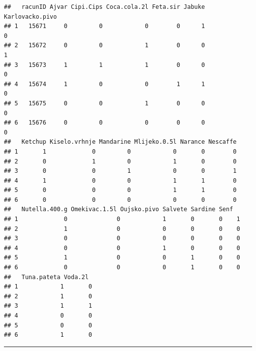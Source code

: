 \documentclass[]{book}
\newenvironment{Shaded}{\begin{snugshade}}{\end{snugshade}}
\newcommand{\KeywordTok}[1]{\textcolor[rgb]{0.13,0.29,0.53}{\textbf{#1}}}
\newcommand{\DataTypeTok}[1]{\textcolor[rgb]{0.13,0.29,0.53}{#1}}
\newcommand{\DecValTok}[1]{\textcolor[rgb]{0.00,0.00,0.81}{#1}}
\newcommand{\StringTok}[1]{\textcolor[rgb]{0.31,0.60,0.02}{#1}}
\newcommand{\OperatorTok}[1]{\textcolor[rgb]{0.81,0.36,0.00}{\textbf{#1}}}
\newcommand{\NormalTok}[1]{#1}
\theoremstyle{definition}
\theoremstyle{definition}
\theoremstyle{definition}
\theoremstyle{remark}
\begin{document}
\begin{Shaded}
\end{Shaded}

\begin{verbatim}
##   racunID Ajvar Cipi.Cips Coca.cola.2l Feta.sir Jabuke Karlovacko.pivo
## 1   15671     0         0            0        0      1               0
## 2   15672     0         0            1        0      0               1
## 3   15673     1         1            1        0      0               0
## 4   15674     1         0            0        1      1               0
## 5   15675     0         0            1        0      0               0
## 6   15676     0         0            0        0      0               0
##   Ketchup Kiselo.vrhnje Mandarine Mlijeko.0.5l Narance Nescaffe
## 1       1             0         0            0       0        0
## 2       0             1         0            1       0        0
## 3       0             0         1            0       0        1
## 4       1             0         0            1       1        0
## 5       0             0         0            1       1        0
## 6       0             0         0            0       0        0
##   Nutella.400.g Omekivac.1.5l Oujsko.pivo Salvete Sardine Senf
## 1             0              0            1       0       0    1
## 2             1              0            0       0       0    0
## 3             0              0            0       0       0    0
## 4             0              0            1       0       0    0
## 5             1              0            0       1       0    0
## 6             0              0            0       1       0    0
##   Tuna.pateta Voda.2l
## 1            1       0
## 2            1       0
## 3            1       1
## 4            0       0
## 5            0       0
## 6            1       0
\end{verbatim}

\begin{center}\rule{0.5\linewidth}{\linethickness}\end{center}
\end{document}
